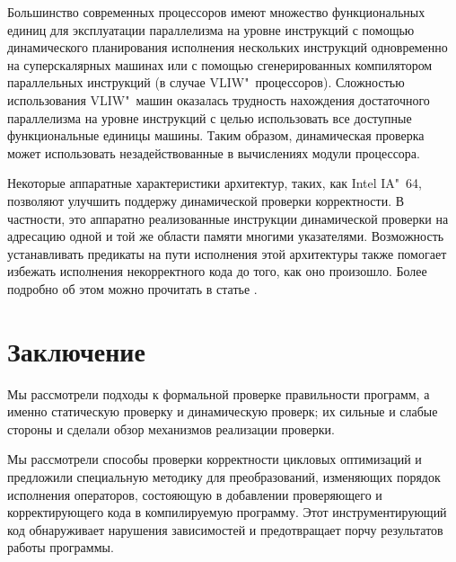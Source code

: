 Большинство современных процессоров имеют множество функциональных единиц для эксплуатации параллелизма на уровне инструкций с помощью динамического планирования исполнения нескольких инструкций одновременно на суперскалярных машинах или с помощью сгенерированных компилятором параллельных инструкций (в случае VLIW"~процессоров). Сложностью использования VLIW"~машин оказалась трудность нахождения достаточного параллелизма на уровне инструкций с целью использовать все доступные функциональные единицы машины. Таким образом, динамическая проверка может использовать незадействованные в вычислениях модули процессора.

Некоторые аппаратные характеристики архитектур, таких, как Intel IA"~64, позволяют улучшить поддержу динамической проверки корректности. В частности, это аппаратно реализованные инструкции динамической проверки на адресацию одной и той же области памяти многими указателями. Возможность устанавливать предикаты на пути исполнения этой архитектуры также помогает избежать исполнения некорректного кода до того, как оно произошло. Более подробно об этом можно прочитать в статье \cite{GHCP02}.

\section*{Заключение}
%

Мы рассмотрели подходы к формальной проверке правильности программ, а именно статическую проверку и динамическую проверк; их сильные и слабые стороны и сделали обзор механизмов реализации проверки.

Мы рассмотрели способы проверки корректности цикловых оптимизаций и предложили специальную методику для преобразований, изменяющих порядок исполнения операторов, состояющую в добавлении проверяющего и корректирующего кода в компилируемую программу. Этот инструментирующий код обнаруживает нарушения зависимостей и предотвращает порчу результатов работы программы.